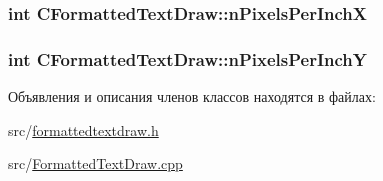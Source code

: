 \hypertarget{class_c_formatted_text_draw_af07e4ff84b148e4c1614782ec37b9b54}{
\subsubsection[{n\-Pixels\-Per\-Inch\-X}]{\setlength{\rightskip}{0pt plus 5cm}int C\-Formatted\-Text\-Draw\-::n\-Pixels\-Per\-Inch\-X}}\label{class_c_formatted_text_draw_af07e4ff84b148e4c1614782ec37b9b54}
\hypertarget{class_c_formatted_text_draw_aed39a1517760cfb53599780e231d481b}{
\subsubsection[{n\-Pixels\-Per\-Inch\-Y}]{\setlength{\rightskip}{0pt plus 5cm}int C\-Formatted\-Text\-Draw\-::n\-Pixels\-Per\-Inch\-Y}}\label{class_c_formatted_text_draw_aed39a1517760cfb53599780e231d481b}


Объявления и описания членов классов находятся в файлах\-:\begin{DoxyCompactItemize}
\item 
src/\hyperlink{formattedtextdraw_8h}{formattedtextdraw.\-h}\item 
src/\hyperlink{_formatted_text_draw_8cpp}{Formatted\-Text\-Draw.\-cpp}\end{DoxyCompactItemize}
